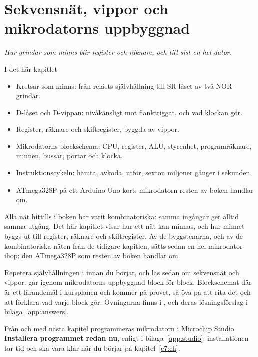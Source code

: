 
\chapter{Sekvensnät, vippor och mikrodatorns uppbyggnad}
\label{c6:ch}

{\large\itshape Hur grindar som minns blir register och räknare, och till sist en hel dator.\par}

\begin{chapterbox}{I det här kapitlet}
\begin{itemize}
  \item Kretsar som minns: från reläets självhållning till SR-låset av två NOR-grindar.
  \item D-låset och D-vippan: nivåkänsligt mot flanktriggat, och vad klockan gör.
  \item Register, räknare och skiftregister, byggda av vippor.
  \item Mikrodatorns blockschema: CPU, register, ALU, styrenhet, programräknare, minnen, bussar,
    portar och klocka.
  \item Instruktionscykeln: hämta, avkoda, utför, sexton miljoner gånger i sekunden.
  \item ATmega328P på ett Arduino Uno-kort: mikrodatorn resten av boken handlar om.
\end{itemize}
\end{chapterbox}

Alla nät hittills i boken har varit kombinatoriska: samma ingångar ger alltid samma utgång. Det
här kapitlet visar hur ett nät kan minnas, och hur minnet byggs ut till register, räknare och
skiftregister. Av de byggstenarna, och av de kombinatoriska näten från de tidigare kapitlen, sätts
sedan en hel mikrodator ihop: den ATmega328P som resten av boken handlar om.

Repetera självhållningen i  innan du börjar, och läs sedan  om
sekvensnät och vippor.  går igenom mikrodatorns uppbyggnad block för block.
Blockschemat där är ett lärandemål i kursplanen och kommer på provet, så öva på att rita det och
att förklara vad varje block gör. Övningarna finns i , och deras
lösningsförslag i bilaga~\ref{app:answers}.

Från och med nästa kapitel programmeras mikrodatorn i Microchip Studio. \textbf{Installera
programmet redan nu}, enligt  i bilaga~\ref{app:studio}: installationen tar tid
och ska vara klar när du börjar på kapitel~\ref{c7:ch}.





